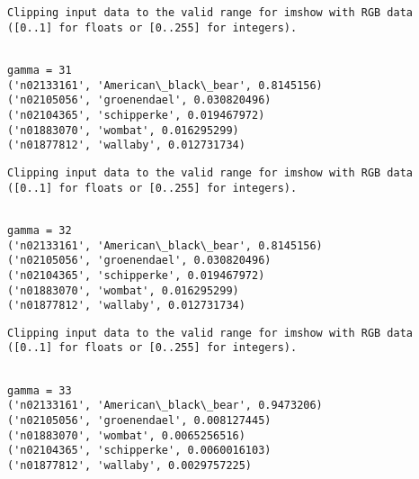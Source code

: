 \documentclass[11pt]{article}
\begin{document}
    \begin{Verbatim}[commandchars=\\\{\}]
Clipping input data to the valid range for imshow with RGB data ([0..1] for floats or [0..255] for integers).

    \end{Verbatim}

    \begin{Verbatim}[commandchars=\\\{\}]

gamma = 31
('n02133161', 'American\_black\_bear', 0.8145156)
('n02105056', 'groenendael', 0.030820496)
('n02104365', 'schipperke', 0.019467972)
('n01883070', 'wombat', 0.016295299)
('n01877812', 'wallaby', 0.012731734)

    \end{Verbatim}

    \begin{Verbatim}[commandchars=\\\{\}]
Clipping input data to the valid range for imshow with RGB data ([0..1] for floats or [0..255] for integers).

    \end{Verbatim}

    \begin{Verbatim}[commandchars=\\\{\}]

gamma = 32
('n02133161', 'American\_black\_bear', 0.8145156)
('n02105056', 'groenendael', 0.030820496)
('n02104365', 'schipperke', 0.019467972)
('n01883070', 'wombat', 0.016295299)
('n01877812', 'wallaby', 0.012731734)

    \end{Verbatim}

    \begin{Verbatim}[commandchars=\\\{\}]
Clipping input data to the valid range for imshow with RGB data ([0..1] for floats or [0..255] for integers).

    \end{Verbatim}

    \begin{Verbatim}[commandchars=\\\{\}]

gamma = 33
('n02133161', 'American\_black\_bear', 0.9473206)
('n02105056', 'groenendael', 0.008127445)
('n01883070', 'wombat', 0.0065256516)
('n02104365', 'schipperke', 0.0060016103)
('n01877812', 'wallaby', 0.0029757225)

    \end{Verbatim}
\end{document}
